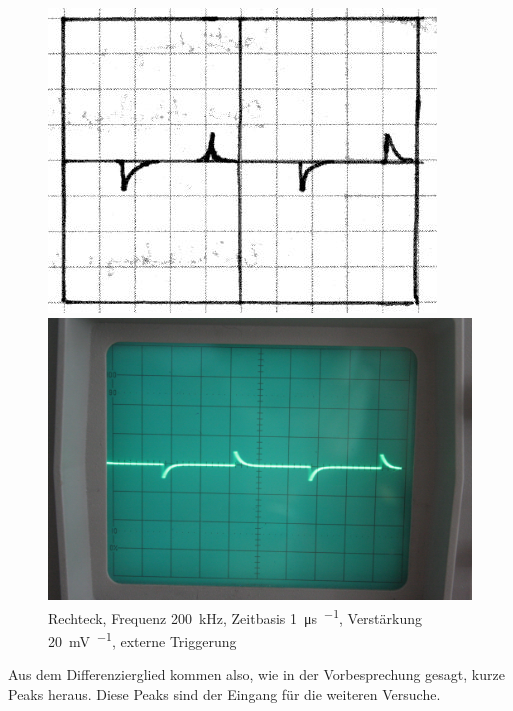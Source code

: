\begin{figure}[htbp]
	\centering
	\begin{minipage}{.45\linewidth}
	\includegraphics[width=\linewidth]{Skizzen/IMG_0755-1500.jpg}
	\end{minipage}
	\hfill
	\begin{minipage}{.45\linewidth}
	\includegraphics[width=\linewidth]{Fotos/IMG_0755-1500.jpg}
	\end{minipage}
	\caption{%
		Rechteck, Frequenz \SI{200}{\kilo\hertz}, Zeitbasis \SI{1}{\micro\second\per\division}, Verstärkung \SI{20}{\milli\volt\per\division}, externe Triggerung
	}
	\label{fig:0755}
\end{figure}

Aus dem Differenzierglied kommen also, wie in der Vorbesprechung gesagt, kurze
Peaks heraus. Diese Peaks sind der Eingang für die weiteren Versuche.

